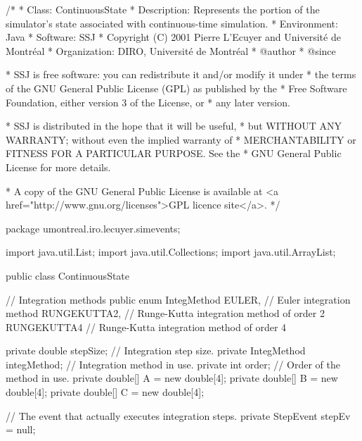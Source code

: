 \begin{code}
\begin{hide}
/*
 * Class:        ContinuousState
 * Description:  Represents the portion of the simulator's state associated
                 with continuous-time simulation.
 * Environment:  Java
 * Software:     SSJ 
 * Copyright (C) 2001  Pierre L'Ecuyer and Université de Montréal
 * Organization: DIRO, Université de Montréal
 * @author       
 * @since

 * SSJ is free software: you can redistribute it and/or modify it under
 * the terms of the GNU General Public License (GPL) as published by the
 * Free Software Foundation, either version 3 of the License, or
 * any later version.

 * SSJ is distributed in the hope that it will be useful,
 * but WITHOUT ANY WARRANTY; without even the implied warranty of
 * MERCHANTABILITY or FITNESS FOR A PARTICULAR PURPOSE.  See the
 * GNU General Public License for more details.

 * A copy of the GNU General Public License is available at
   <a href="http://www.gnu.org/licenses">GPL licence site</a>.
 */
\end{hide}
package umontreal.iro.lecuyer.simevents;\begin{hide}

import java.util.List;
import java.util.Collections;
import java.util.ArrayList;\end{hide}


public class ContinuousState \begin{hide} {
\end{hide}

   // Integration methods
   public enum IntegMethod{ 
      EULER,            // Euler integration method
      RUNGEKUTTA2,      // Runge-Kutta integration method of order 2
      RUNGEKUTTA4       // Runge-Kutta integration method of order 4
   }\begin{hide}

   private double stepSize;            // Integration step size.
   private IntegMethod integMethod;    // Integration method in use.
   private int order;                  // Order of the method in use.
   private double[] A = new double[4];
   private double[] B = new double[4];
   private double[] C = new double[4];

   // The event that actually executes integration steps.
   private StepEvent stepEv = null;


\end{hide}
\end{code}
